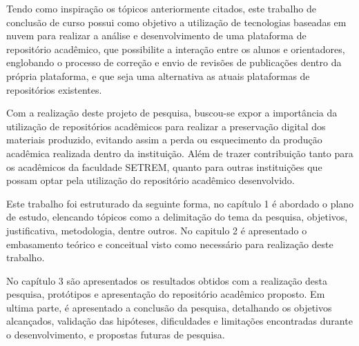 Tendo como inspiração os tópicos anteriormente citados,
este trabalho de conclusão de curso possui como objetivo a utilização
de tecnologias baseadas em nuvem para realizar a análise e
desenvolvimento de uma plataforma de repositório acadêmico,
que possibilite a interação entre os alunos e orientadores,
englobando o processo de correção e envio de revisões
de publicações dentro da própria plataforma, e que seja uma alternativa
as atuais plataformas de repositórios existentes.

Com a realização deste projeto de pesquisa, buscou-se expor a
importância da utilização de repositórios acadêmicos para realizar
a preservação digital dos materiais produzido, evitando assim a perda
ou esquecimento da produção acadêmica realizada dentro da instituição.
Além de trazer contribuição tanto para os acadêmicos da faculdade SETREM, quanto para outras
instituições que possam optar pela utilização do repositório
acadêmico desenvolvido.

Este trabalho foi estruturado da seguinte forma, no capítulo 1
é abordado o plano de estudo, elencando tópicos como a delimitação
do tema da pesquisa, objetivos, justificativa, metodologia, dentre outros.
No capitulo 2 é apresentado o embasamento teórico e conceitual
visto como necessário para realização deste trabalho.

No capítulo 3 são apresentados os resultados obtidos com a realização desta
pesquisa, protótipos e apresentação do repositório acadêmico proposto.
Em ultima parte, é apresentado a conclusão da pesquisa,
detalhando os objetivos alcançados, validação das hipóteses, dificuldades
e limitações encontradas durante o desenvolvimento, e propostas futuras
de pesquisa.